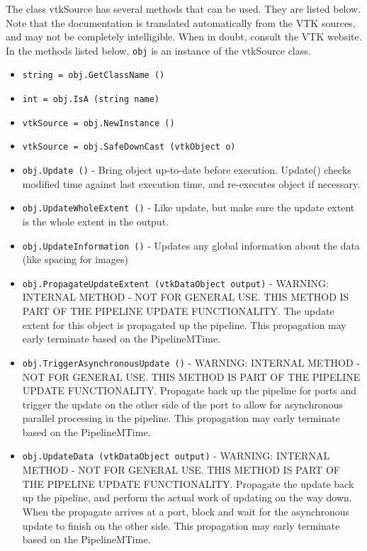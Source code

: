 The class vtkSource has several methods that can be used.
  They are listed below.
Note that the documentation is translated automatically from the VTK sources,
and may not be completely intelligible.  When in doubt, consult the VTK website.
In the methods listed below, \verb|obj| is an instance of the vtkSource class.
\begin{itemize}
\item  \verb|string = obj.GetClassName ()|

\item  \verb|int = obj.IsA (string name)|

\item  \verb|vtkSource = obj.NewInstance ()|

\item  \verb|vtkSource = obj.SafeDownCast (vtkObject o)|

\item  \verb|obj.Update ()| -  Bring object up-to-date before execution. Update() checks modified
 time against last execution time, and re-executes object if necessary.

\item  \verb|obj.UpdateWholeExtent ()| -  Like update, but make sure the update extent is the whole extent in
 the output.

\item  \verb|obj.UpdateInformation ()| -  Updates any global information about the data 
 (like spacing for images)

\item  \verb|obj.PropagateUpdateExtent (vtkDataObject output)| -  WARNING: INTERNAL METHOD - NOT FOR GENERAL USE. 
 THIS METHOD IS PART OF THE PIPELINE UPDATE FUNCTIONALITY.
 The update extent for this object is propagated up the pipeline.
 This propagation may early terminate based on the PipelineMTime.

\item  \verb|obj.TriggerAsynchronousUpdate ()| -  WARNING: INTERNAL METHOD - NOT FOR GENERAL USE. 
 THIS METHOD IS PART OF THE PIPELINE UPDATE FUNCTIONALITY.
 Propagate back up the pipeline for ports and trigger the update on the
 other side of the port to allow for asynchronous parallel processing in
 the pipeline.
 This propagation may early terminate based on the PipelineMTime.

\item  \verb|obj.UpdateData (vtkDataObject output)| -  WARNING: INTERNAL METHOD - NOT FOR GENERAL USE. 
 THIS METHOD IS PART OF THE PIPELINE UPDATE FUNCTIONALITY.
 Propagate the update back up the pipeline, and perform the actual 
 work of updating on the way down. When the propagate arrives at a
 port, block and wait for the asynchronous update to finish on the
 other side.
 This propagation may early terminate based on the PipelineMTime.


\end{itemize}
